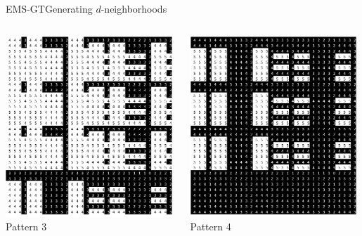\documentclass[pdf,xcolor={dvipsnames}]{beamer}
\begin{document}
\begin{frame}{EMS-GT}{Generating $d$-neighborhoods}
\begin{itemize}
{\begin{columns}
			\begin{column}{.135\textwidth}\centering\includegraphics[width=0.98\textwidth]{img/3}\\Pattern 3 \end{column}
			\begin{column}{.135\textwidth}\centering\includegraphics[width=0.98\textwidth]{img/4}\\Pattern 4 \end{column}

\end{columns}}
\end{itemize}
\end{frame}
\end{document}
